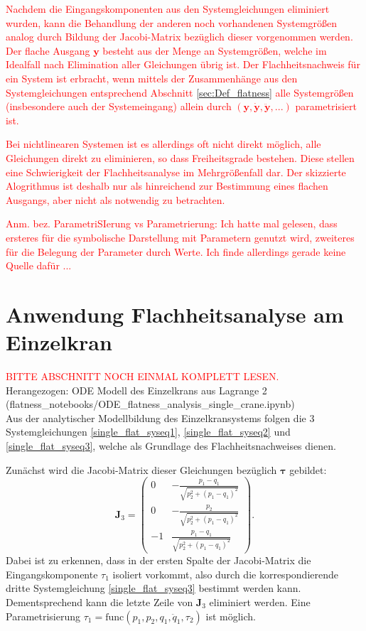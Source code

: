\textcolor{red}{Nachdem die Eingangskomponenten aus den Systemgleichungen eliminiert wurden, kann die Behandlung der anderen noch vorhandenen Systemgrößen analog durch Bildung der Jacobi-Matrix bezüglich dieser vorgenommen werden. Der  flache Ausgang $\mathbf{y}$ besteht aus der Menge an Systemgrößen, welche im Idealfall nach Elimination aller Gleichungen übrig ist. Der Flachheitsnachweis für ein System ist erbracht, wenn mittels der Zusammenhänge aus den Systemgleichungen entsprechend Abschnitt \ref{sec:Def_flatness} alle Systemgrößen (insbesondere auch der Systemeingang) allein durch $(\mathbf{y}, \dot{\mathbf{y}}, \ddot{\mathbf{y}}, ...)$ parametrisiert ist.}

\textcolor{red}{Bei nichtlinearen Systemen ist es allerdings oft nicht direkt möglich, alle Gleichungen direkt zu eliminieren, so dass Freiheitsgrade bestehen. Diese stellen eine Schwierigkeit der Flachheitsanalyse im Mehrgrößenfall dar. Der skizzierte Alogrithmus ist deshalb nur als hinreichend zur Bestimmung eines flachen Ausgangs, aber nicht als notwendig zu betrachten.}

\textcolor{red}{Anm. bez. ParametriSIerung vs Parametrierung: Ich hatte mal gelesen, dass ersteres für die symbolische Darstellung mit Parametern genutzt wird, zweiteres für die Belegung der Parameter durch Werte. Ich finde allerdings gerade keine Quelle dafür ...}

\section{Anwendung Flachheitsanalyse am Einzelkran}
\textcolor{red}{BITTE ABSCHNITT NOCH EINMAL KOMPLETT LESEN.}\\
Herangezogen: ODE Modell des Einzelkrans aus Lagrange 2 \\ (flatness\_notebooks/ODE\_flatness\_analysis\_single\_crane.ipynb) \\
Aus der analytischer Modellbildung des Einzelkransystems folgen die 3 Systemgleichungen \eqref{single_flat_syseq1}, \eqref{single_flat_syseq2} und \eqref{single_flat_syseq3}, welche als Grundlage des Flachheitsnachweises dienen. 

Zunächst wird die Jacobi-Matrix dieser Gleichungen bezüglich $\boldsymbol{\tau}$ gebildet:
\begin{equation}
	\mathbf{J}_3 =
	\left(\begin{matrix}
		0 & - \frac{p_{1} - q_{1}}{\sqrt{p_{2}^{2} + \left(p_{1} - q_{1}\right)^{2}}}\\
		0 & - \frac{p_{2}}{\sqrt{p_{2}^{2} + \left(p_{1} - q_{1}\right)^{2}}}\\
		-1 & \frac{p_{1} - q_{1}}{\sqrt{p_{2}^{2} + \left(p_{1} - q_{1}\right)^{2}}}
	\end{matrix}\right).
\end{equation}
Dabei ist zu erkennen, dass in der ersten Spalte der Jacobi-Matrix die Eingangskomponente $\tau_{1}$ isoliert vorkommt, also durch die korrespondierende dritte Systemgleichung \eqref{single_flat_syseq3} bestimmt werden kann. Dementsprechend kann die letzte Zeile von $\mathbf{J}_3$ eliminiert werden. Eine Parametrisierung $\tau_1 = \mathrm{func}(p_1, p_2, q_1, \ddot{q}_1, \tau_2)$ ist möglich.

